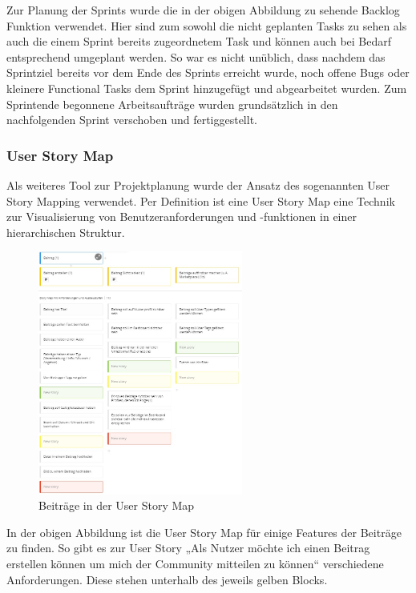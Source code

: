 Zur Planung der Sprints wurde die in der obigen Abbildung zu sehende Backlog Funktion verwendet. Hier sind zum sowohl die nicht geplanten Tasks zu sehen als auch die einem Sprint bereits zugeordnetem Task und können auch bei Bedarf entsprechend umgeplant werden. So war es nicht unüblich, dass nachdem das Sprintziel bereits vor dem Ende des Sprints erreicht wurde, noch offene Bugs oder kleinere Functional Tasks dem Sprint hinzugefügt und abgearbeitet wurden. Zum Sprintende begonnene Arbeitsaufträge wurden grundsätzlich in den nachfolgenden Sprint verschoben und fertiggestellt.

\subsubsection{User Story Map}
Als weiteres Tool zur Projektplanung wurde der Ansatz des sogenannten User Story Mapping verwendet. Per Definition ist eine User Story Map eine Technik zur Visualisierung von Benutzeranforderungen und -funktionen in einer hierarchischen Struktur.

\begin{figure}[h!]
    \centering
    \includegraphics[width=0.6\textwidth]{figures/andre/userstorymap.jpg}
    \caption{Beiträge in der User Story Map}
    \label{fig:userstorymap}
\end{figure}

In der obigen Abbildung ist die User Story Map für einige Features der Beiträge zu finden. So gibt es zur User Story „Als Nutzer möchte ich einen Beitrag erstellen können um mich der Community mitteilen zu können“ verschiedene Anforderungen. Diese stehen unterhalb des jeweils gelben Blocks. 

